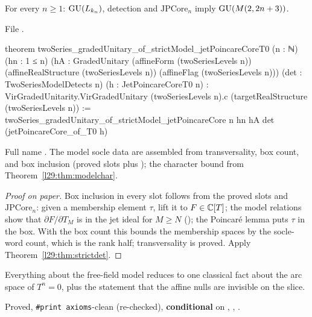 \begin{theorem}\label{l29:thm:strictpoincare}
For every $n\ge1$: $\mathrm{GU}(L_{k_n})$, detection and $\mathrm{JPCore}_n$ imply $\mathrm{GU}(M(2,2n+3))$.
\end{theorem}

\noindent File .
\begin{leancode}
theorem twoSeries_gradedUnitary_of_strictModel_jetPoincareCoreT0 (n : ℕ) (hn : 1 ≤ n)
    (hA : GradedUnitary (affineForm (twoSeriesLevels n)) (affineRealStructure (twoSeriesLevels n))
      (affineFlag (twoSeriesLevels n)))
    (det : TwoSeriesModelDetects n) (h : JetPoincareCoreT0 n) :
    VirGradedUnitarity.VirGradedUnitary (twoSeriesLevels n).c
      (targetRealStructure (twoSeriesLevels n)) :=
  twoSeries_gradedUnitary_of_strictModel_jetPoincareCore n hn hA det (jetPoincareCore_of_T0 h)
\end{leancode}

\begin{dictionary}
Full name . The model socle
data are assembled from transversality, box count, and box inclusion (proved slots plus ); the character bound
from Theorem~\ref{l29:thm:modelchar}.
\end{dictionary}

\begin{proof}[Proof on paper]
Box inclusion in every slot follows from the proved slots and $\mathrm{JPCore}_n$: given a membership element $\tau$,
lift it to $F\in{\mathbb{C}}[T]$; the model relations show that $\partial F/\partial T_M$ is in the jet ideal for $M\ge N$
(); the Poincar\'e lemma puts $\tau$ in the box. With the box count this bounds the
membership spaces by the socle-word count, which is the rank half; transversality is proved. Apply
Theorem~\ref{l29:thm:strictdet}.
\end{proof}

\begin{physics}
Everything about the free-field model reduces to one classical fact about the arc space of $T^n=0$, plus the
statement that the affine nulls are invisible on the slice.
\end{physics}

\begin{status}
Proved, \texttt{\#print axioms}-clean (re-checked), \textbf{conditional} on , , .
\end{status}

